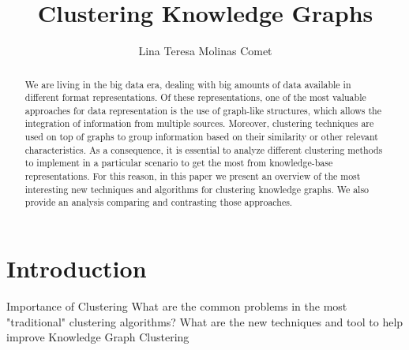 \documentclass[runningheads]{llncs}
\begin{document}
%
\title{Clustering Knowledge Graphs}
%
%
\author{Lina Teresa Molinas Comet}
%
%
%
\maketitle              %
%
\begin{abstract}
We are living in the big data era, dealing with big amounts of data available in different format representations. Of these representations, one of the most valuable approaches for data representation is the use of graph-like structures, which allows the integration of information from multiple sources. Moreover, clustering techniques are used on top of graphs to group information based on their similarity or other relevant characteristics. As a consequence, it is essential to analyze different clustering methods to implement in a particular scenario to get the most from knowledge-base representations. For this reason, in this paper we present an overview of the most interesting new techniques and algorithms for clustering knowledge graphs. We also provide an analysis comparing and contrasting those approaches.

\end{abstract}
%
%
%
\section{Introduction} \label{introduction}
Importance of Clustering
What are the common problems in the most "traditional" clustering algorithms?
What are the new techniques and tool to help improve Knowledge Graph Clustering
\end{document}
